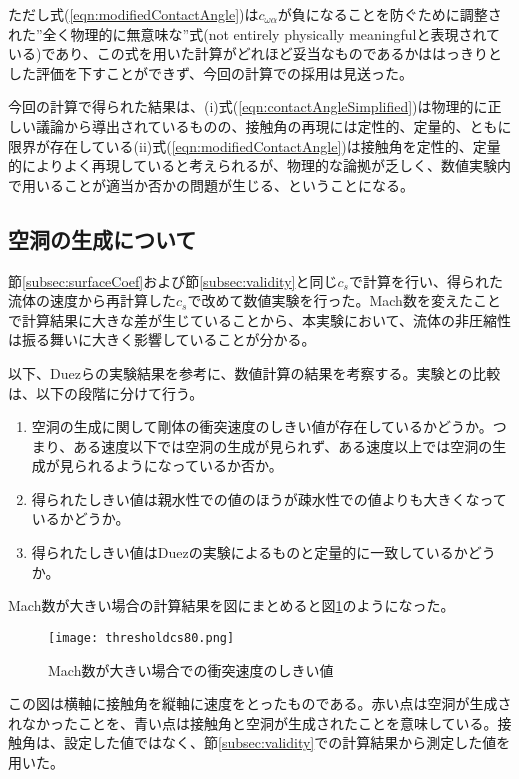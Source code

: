 \documentclass[]{jsarticle}
\begin{document}
ただし式(\ref{eqn:modifiedContactAngle})は$c_{\omega\alpha}$が負になることを防ぐために調整された”全く物理的に無意味な”式(not entirely physically meaningfulと表現されている\cite{Yang2017})であり、この式を用いた計算がどれほど妥当なものであるかははっきりとした評価を下すことができず、今回の計算での採用は見送った。

今回の計算で得られた結果は、(i)式(\ref{eqn:contactAngleSimplified})は物理的に正しい議論から導出されているものの、接触角の再現には定性的、定量的、ともに限界が存在している(ii)式(\ref{eqn:modifiedContactAngle})は接触角を定性的、定量的によりよく再現していると考えられるが、物理的な論拠が乏しく、数値実験内で用いることが適当か否かの問題が生じる、ということになる。

\subsection{空洞の生成について}
\label{subsec:discCavityForm}
節\ref{subsec:surfaceCoef}および節\ref{subsec:validity}と同じ$c_s$で計算を行い、得られた流体の速度から再計算した$c_s$で改めて数値実験を行った。Mach数を変えたことで計算結果に大きな差が生じていることから、本実験において、流体の非圧縮性は振る舞いに大きく影響していることが分かる。

以下、Duezらの実験結果を参考に、数値計算の結果を考察する。実験との比較は、以下の段階に分けて行う。
\begin{enumerate}
\item 空洞の生成に関して剛体の衝突速度のしきい値が存在しているかどうか。つまり、ある速度以下では空洞の生成が見られず、ある速度以上では空洞の生成が見られるようになっているか否か。
\item 得られたしきい値は親水性での値のほうが疎水性での値よりも大きくなっているかどうか。
\item 得られたしきい値はDuezの実験によるものと定量的に一致しているかどうか。
\end{enumerate}


Mach数が大きい場合の計算結果を図にまとめると図\ref{fig:threscs80}のようになった。
\begin{figure}[H]
  \centering
  \texttt{[image: thresholdcs80.png]}
  \caption{Mach数が大きい場合での衝突速度のしきい値
    \label{fig:threscs80} }
\end{figure}

この図は横軸に接触角を縦軸に速度をとったものである。赤い点は空洞が生成されなかったことを、青い点は接触角と空洞が生成されたことを意味している。接触角は、設定した値ではなく、節\ref{subsec:validity}での計算結果から測定した値を用いた。
\end{document}
